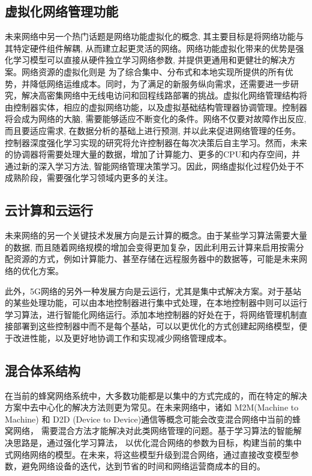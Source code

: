 ﻿\documentclass[11pt,draftclsnofoot,onecolumn,journal,letterpaper]{IEEEtran}
\begin{document}
\subsection{虚拟化网络管理功能}

未来网络中另一个热门话题是网络功能虚拟化的概念, 其主要目标是将网络功能与其特定硬件组件解耦, 从而建立起更灵活的网络。网络功能虚拟化带来的优势是强化学习模型可以直接从硬件独立学习网络参数, 并提供更通用和更健壮的解决方案。网络资源的虚拟化则是 为了综合集中、分布式和本地实现所提供的所有优势，并降低网络运维成本。同时，为了满足的新服务纵向需求，还需要进一步研究，解决高密集网络中无线电访问和回程线路部署的挑战。虚拟化网络管理结构将由控制器实体，相应的虚拟网络功能，以及虚拟基础结构管理器协调管理。控制器将会成为网络的大脑, 需要能够适应不断变化的条件。网络不仅要对故障作出反应, 而且要适应需求, 在数据分析的基础上进行预测, 并以此来促进网络管理的任务。控制器深度强化学习实现的研究将允许控制器在每次决策后自主学习。然而，未来的协调器将需要处理大量的数据，增加了计算能力、更多的CPU和内存空间，并通过新的深入学习方法, 智能网络管理决策学习。因此，网络虚拟化过程仍处于不成熟阶段，需要强化学习领域内更多的关注。

\subsection{云计算和云运行}
未来网络的另一个关键技术发展方向是云计算的概念。由于某些学习算法需要大量的数据, 而且随着网络规模的增加会变得更加复杂，因此利用云计算来启用按需分配资源的方式，例如计算能力、甚至存储在远程服务器中的数据等，可能是未来网络的优化方案。

此外，5G网络的另外一种发展方向是云运行，尤其是集中式解决方案。对于基站的某些处理功能，可以由本地控制器进行集中式处理，在本地控制器中则可以运行学习算法，进行智能化网络运行。添加本地控制器的好处在于，将网络管理机制直接部署到这些控制器中而不是每个基站，可以以更优化的方式创建起网络模型，便于改进性能，以及更好地协调工作和实现减少网络管理成本。

\subsection{混合体系结构}
在当前的蜂窝网络系统中，大多数功能都是以集中的方式完成的，而在特定的解决方案中去中心化的解决方法则更为常见。在未来网络中，诸如 M2M(Machine to Machine) 和 D2D (Device to Device)通信等概念可能会改变混合网络中当前的蜂窝网络， 需要混合方法才能解决对此类网络管理的问题。基于学习算法的智能解决思路是，通过强化学习算法， 以优化混合网络的参数为目标，构建当前的集中式网络网络的模型。在未来，将这些模型升级到混合网络，通过直接改变模型参数，避免网络设备的迭代，达到节省的时间和网络运营商成本的目的。
\end{document}
